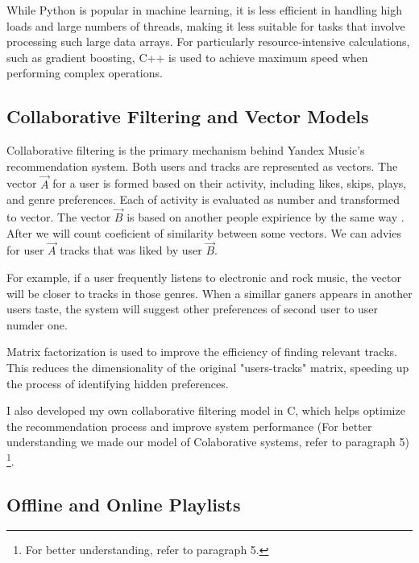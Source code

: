 \documentclass[12pt,a4paper]{article}
\begin{document}
While Python is popular in machine learning, it is less efficient in handling high loads and large numbers of threads, making it less suitable for tasks that involve processing such large data arrays. For particularly resource-intensive calculations, such as gradient boosting, C++ is used to achieve maximum speed when performing complex operations.

\subsection{Collaborative Filtering and Vector Models}

Collaborative filtering is the primary mechanism behind Yandex Music’s recommendation system. Both users and tracks are represented as vectors. The vector $\vec{A}$ for a user is formed based on their activity, including likes, skips, plays, and genre preferences. Each of activity is evaluated as number and transformed to vector. The vector $\vec{B}$ is based on another people  expirience by the same way \citep{Yandex}. After we will count coeficient of similarity between some vectors. We can advies for user $\vec{A}$ tracks that was liked by user $\vec{B}$.

For example, if a user frequently listens to electronic and rock music, the vector will be closer to tracks in those genres. When a simillar ganers appears in another users taste, the system will suggest other preferences of second user to user numder one.

Matrix factorization is used to improve the efficiency of finding relevant tracks. This reduces the dimensionality of the original "users-tracks" matrix, speeding up the process of identifying hidden preferences.

I also developed my own collaborative filtering model in C, which helps optimize the recommendation process and improve system performance (For better understanding we made our model of Colaborative systems, refer to paragraph 5) \footnote{For better understanding, refer to paragraph 5.}.

\subsection{Offline and Online Playlists}
\end{document}
